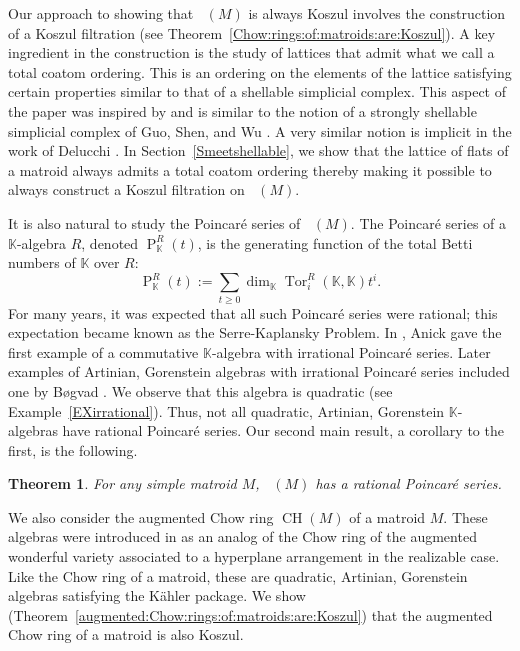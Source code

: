 \documentclass[11pt, reqno]{amsart}
\DeclareMathOperator{\aChow}{CH}             		%
\DeclareMathOperator{\Chow}{\underline{CH}}		%
\newcommand{\kk}{\mathbb{K}}					%
\DeclareMathOperator{\Poin}{P}
\DeclareMathOperator{\Tor}{Tor}
\newtheorem{thm}{Theorem}[section]
\theoremstyle{definition}
\numberwithin{equation}{section}
\numberwithin{table}{section}
\begin{document}
\begin{spacing}{1.1}
Our approach to showing that $\Chow(M)$ is always Koszul involves the construction of a Koszul filtration (see Theorem~\ref{Chow:rings:of:matroids:are:Koszul}).  A key ingredient in the construction is the study of lattices that admit what we call a total coatom ordering.  This is an ordering on the elements of the lattice satisfying certain properties similar to that of a shellable simplicial complex.  This aspect of the paper was inspired by and is similar to the notion of a strongly shellable simplicial complex of Guo, Shen, and Wu \cite{GSW19}.  A very similar notion is implicit in the work of Delucchi \cite{Del08}.  In Section~\ref{Smeetshellable}, we show that the lattice of flats of a matroid always admits a total coatom ordering thereby making it possible to always construct a Koszul filtration on $\Chow(M)$.  

It is also natural to study the Poincar\'{e} series of $\Chow(M)$.  The Poincar\'{e} series of a $\kk$-algebra $R$, denoted $\Poin_\kk^R(t)$, is the generating function of the total Betti numbers of $\kk$ over $R$:
\[\Poin_\kk^R(t) := \sum_{t \ge 0} \dim_\kk \Tor^R_i(\kk,\kk)t^i.\]
For many years, it was expected that all such Poincar\'{e} series were rational; this expectation became known as the Serre-Kaplansky Problem.  In \cite[Example 7.1]{Ani82}, Anick gave the first example of a commutative $\kk$-algebra with irrational Poincar\'{e} series.  Later examples of Artinian, Gorenstein algebras with irrational Poincar\'{e} series included one by B{\o}gvad \cite{Bog83}.  We observe that this algebra is quadratic (see Example~\ref{EXirrational}).  Thus, not all quadratic, Artinian, Gorenstein $\kk$-algebras have rational Poincar\'{e} series.  Our second main result, a corollary to the first, is the following.

\begin{thm}\label{mainthm2} 
For any simple matroid $M$, $\Chow(M)$ has a rational Poincar\'{e} series.
\end{thm}

We also consider the augmented Chow ring $\aChow(M)$ of a matroid $M$.  These algebras were introduced in \cite{BHMPW20a} as an analog of the Chow ring of the augmented wonderful variety associated to a hyperplane arrangement in the realizable case.  Like the Chow ring of a matroid, these are quadratic, Artinian, Gorenstein algebras satisfying the K\"ahler package.  We show (Theorem~\ref{augmented:Chow:rings:of:matroids:are:Koszul}) that the augmented Chow ring of a matroid is also Koszul.  


\end{spacing}
\end{document}
